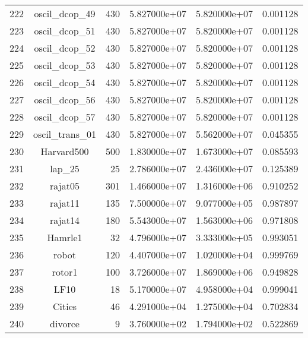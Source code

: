 \documentclass[8pt]{report}
\begin{document}
\begin{table*}
\begin{tabular}{|l|c|r|r|r|r|}
222 &            oscil\_dcop\_49 &   430 &  5.827000e+07 &  5.820000e+07 &  0.001128 \\
223 &            oscil\_dcop\_51 &   430 &  5.827000e+07 &  5.820000e+07 &  0.001128 \\
224 &            oscil\_dcop\_52 &   430 &  5.827000e+07 &  5.820000e+07 &  0.001128 \\
225 &            oscil\_dcop\_53 &   430 &  5.827000e+07 &  5.820000e+07 &  0.001128 \\
226 &            oscil\_dcop\_54 &   430 &  5.827000e+07 &  5.820000e+07 &  0.001128 \\
227 &            oscil\_dcop\_56 &   430 &  5.827000e+07 &  5.820000e+07 &  0.001128 \\
228 &            oscil\_dcop\_57 &   430 &  5.827000e+07 &  5.820000e+07 &  0.001128 \\
229 &           oscil\_trans\_01 &   430 &  5.827000e+07 &  5.562000e+07 &  0.045355 \\
230 &               Harvard500 &   500 &  1.830000e+07 &  1.673000e+07 &  0.085593 \\
231 &                   lap\_25 &    25 &  2.786000e+07 &  2.436000e+07 &  0.125389 \\
232 &                  rajat05 &   301 &  1.466000e+07 &  1.316000e+06 &  0.910252 \\
233 &                  rajat11 &   135 &  7.500000e+07 &  9.077000e+05 &  0.987897 \\
234 &                  rajat14 &   180 &  5.543000e+07 &  1.563000e+06 &  0.971808 \\
235 &                  Hamrle1 &    32 &  4.796000e+07 &  3.333000e+05 &  0.993051 \\
236 &                    robot &   120 &  4.407000e+07 &  1.020000e+04 &  0.999769 \\
237 &                   rotor1 &   100 &  3.726000e+07 &  1.869000e+06 &  0.949828 \\
238 &                     LF10 &    18 &  5.170000e+07 &  4.958000e+04 &  0.999041 \\
239 &                   Cities &    46 &  4.291000e+04 &  1.275000e+04 &  0.702834 \\
240 &                  divorce &     9 &  3.760000e+02 &  1.794000e+02 &  0.522869 \\
\bottomrule
\end{tabular}
\end{table*}
\end{document}
